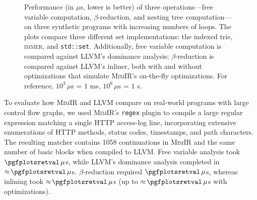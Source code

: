 \documentclass[9pt]{extarticle}                   %
\makeatletter
\newcommand{\toolname}[1]{\textsc{#1}\@\xspace}
\newcommand{\immer}{\toolname{immer}}
\newcommand{\llvm}{\toolname{LLVM}}
\newcommand{\mimir}{\toolname{MimIR}}
\makeatother
\begin{document}
\begin{figure}[t]
    \vspace{-3ex}
    \caption{%
        Performance (in $\mu$s, lower is better) of three operations---free variable computation, $\beta$-reduction, and nesting tree computation---on three synthetic programs with increasing numbers of loops.
        The plots compare three different set implementations: the indexed trie, \immer, and \texttt{std::set}.
        Additionally, free variable computation is compared against LLVM's dominance analysis;
        $\beta$-reduction is compared against LLVM's inliner, both with and without optimizations that simulate \mimir's on-the-fly optimizations.
        For reference, $10^3\,\mu$s = $1$ ms, $10^6\,\mu$s = $1$ s.%
    }
    \label{fig:bench}
\end{figure}


\datadom
{}\datainl
{}\dataopt
{}\datafvs
{}\databeta

\of{\datadom}  \edef\vardom{\pgfplotsretval}
\of{\datainl}  \edef\varinl{\pgfplotsretval}
\of{\dataopt}  \edef\varopt{\pgfplotsretval}
\of{\datafvs}  \edef\varfvs{\pgfplotsretval}
\of{\databeta} \edef\varbeta{\pgfplotsretval}

To evaluate how \mimir and \llvm compare on real-world programs with large control flow graphs, we used \mimir's \texttt{regex} plugin to compile a large regular expression matching a single HTTP access-log line, incorporating extensive enumerations of HTTP methods, status codes, timestamps, and path characters.
The resulting matcher contains 1058 continuations in \mimir and the same number of basic blocks when compiled to \llvm.
Free variable analysis took $\varfvs\,\mu$s, while \llvm's dominance analysis completed in $\approx\!\vardom\,\mu$s.
$\beta$-reduction required $\varbeta\,\mu$s, whereas inlining took $\approx\!\varinl\,\mu$s (up to $\approx\!\varopt\,\mu$s with optimizations).
\end{document}
